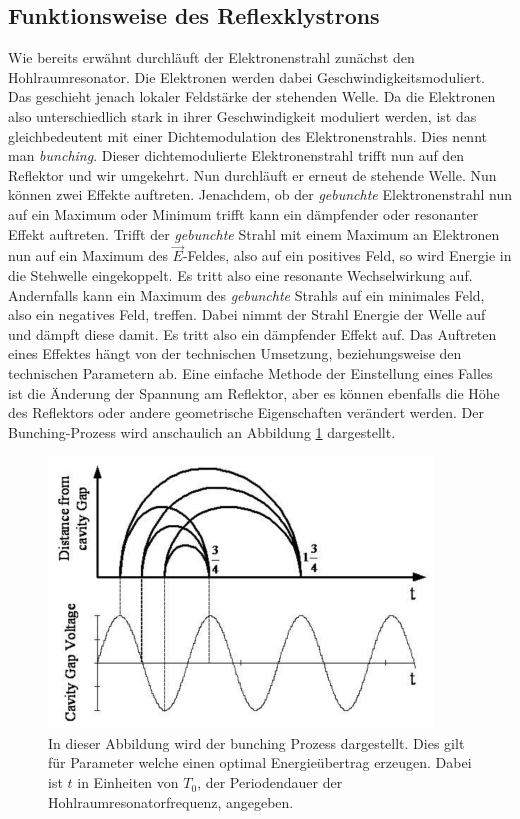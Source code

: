 \subsection{Funktionsweise des Reflexklystrons}
\label{subsec:funktion}
Wie bereits erwähnt durchläuft der Elektronenstrahl zunächst den Hohlraumresonator. Die Elektronen werden dabei Geschwindigkeitsmoduliert.
Das geschieht jenach lokaler Feldstärke der stehenden Welle. Da die Elektronen also unterschiedlich stark in ihrer Geschwindigkeit moduliert werden, ist das gleichbedeutent mit einer
Dichtemodulation des Elektronenstrahls. Dies nennt man \textit{bunching}. Dieser dichtemodulierte Elektronenstrahl trifft nun auf den Reflektor und wir umgekehrt. Nun durchläuft er 
erneut de stehende Welle. Nun können zwei Effekte auftreten. Jenachdem, ob der \textit{gebunchte} Elektronenstrahl nun auf ein Maximum oder Minimum trifft kann ein dämpfender oder 
resonanter Effekt auftreten. Trifft der \textit{gebunchte} Strahl mit einem Maximum an Elektronen nun auf ein Maximum des $\vec{E}$-Feldes, also auf ein positives Feld, so wird 
Energie in die Stehwelle eingekoppelt. Es tritt also eine resonante Wechselwirkung auf. Andernfalls kann ein Maximum des \textit{gebunchte} Strahls auf ein minimales Feld, also 
ein negatives Feld, treffen. Dabei nimmt der Strahl Energie der Welle auf und dämpft diese damit. Es tritt also ein dämpfender Effekt auf. Das Auftreten eines Effektes hängt von der 
technischen Umsetzung, beziehungsweise den technischen Parametern ab. Eine einfache Methode der Einstellung eines Falles ist die Änderung der Spannung am Reflektor, aber es können 
ebenfalls die Höhe des Reflektors oder andere geometrische Eigenschaften verändert werden. Der Bunching-Prozess wird anschaulich an Abbildung \ref{fig:bunching} dargestellt.

\begin{figure}
              \centering
              \includegraphics{content/bunching.PNG}
              \caption{In dieser Abbildung wird der bunching Prozess dargestellt. Dies gilt für Parameter welche einen optimal Energieübertrag erzeugen. Dabei ist $t$ in Einheiten von 
              $T_0$, der Periodendauer der Hohlraumresonatorfrequenz, angegeben.}
              \label{fig:bunching}
\end{figure}

